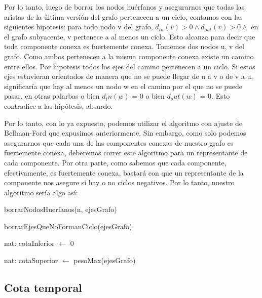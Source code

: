 Por lo tanto, luego de borrar los nodos huérfanos y asegurarnos que todas las aristas de la última versión del grafo pertenecen a un ciclo, contamos con las siguientes hipotesis: para todo nodo v del grafo, $d_{in} (v) > 0 \land d_{out} (v) > 0 \land$ en el grafo subyacente, v pertenece a al menos un ciclo. Esto alcanza para decir que toda componente conexa es fuertemente conexa. Tomemos dos nodos u, v del grafo. Como ambos pertenecen a la misma componente conexa existe un camino entre ellos. Por hipotesis todos los ejes del camino pertenecen a un ciclo. Si estos ejes estuvieran orientados de manera que no se puede llegar de u a v o de v a u, significaría que hay al menos un nodo w en el camino por el que no se puede pasar, en otras palarbas o bien $d_in(w)$ = 0 o bien $d_out(w)$ = 0. Esto contradice a las hipótesis, absurdo.

Por lo tanto, con lo ya expuesto, podemos utilizar el algoritmo con ajuste de Bellman-Ford que expusimos anteriormente. Sin embargo, como solo podemos asegurarnos que cada una de las componentes conexas de nuestro grafo es fuertemente conexa, deberemos correr este algoritmo para un representante de cada componente. Por otra parte, como sabemos que cada componente, efectivamente, es fuertemente conexa, bastará con que un representante de la componente nos asegure si hay o no ciclos negativos. Por lo tanto, nuestro algoritmo sería algo así:

\begin{algorithm}[H]
	\NoCaptionOfAlgo
	\caption{}
	
	borrarNodosHuerfanos(n, ejesGrafo)

	borrarEjesQueNoFormanCiclo(ejesGrafo)

	nat: cotaInferior $\leftarrow$ 0

	nat: cotaSuperior $\leftarrow$ pesoMax(ejesGrafo)

\end{algorithm}

\subsection{Cota temporal}

